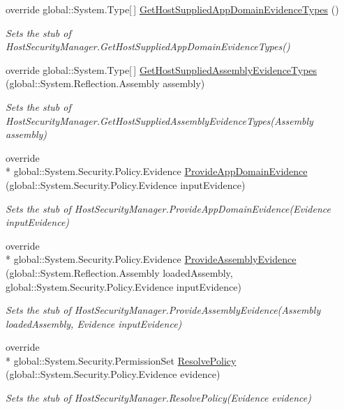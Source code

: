 \begin{DoxyCompactItemize}
override global\-::\-System.\-Type\mbox{[}$\,$\mbox{]} \hyperlink{class_system_1_1_security_1_1_fakes_1_1_stub_host_security_manager_a466f6fee524b1cc9ffa3f8e5c3e6c453}{Get\-Host\-Supplied\-App\-Domain\-Evidence\-Types} ()
\begin{DoxyCompactList}\small\item\em Sets the stub of Host\-Security\-Manager.\-Get\-Host\-Supplied\-App\-Domain\-Evidence\-Types()\end{DoxyCompactList}\item 
override global\-::\-System.\-Type\mbox{[}$\,$\mbox{]} \hyperlink{class_system_1_1_security_1_1_fakes_1_1_stub_host_security_manager_af9335da5c92f3f920ccef52457a0aa67}{Get\-Host\-Supplied\-Assembly\-Evidence\-Types} (global\-::\-System.\-Reflection.\-Assembly assembly)
\begin{DoxyCompactList}\small\item\em Sets the stub of Host\-Security\-Manager.\-Get\-Host\-Supplied\-Assembly\-Evidence\-Types(\-Assembly assembly)\end{DoxyCompactList}\item 
override \\*
global\-::\-System.\-Security.\-Policy.\-Evidence \hyperlink{class_system_1_1_security_1_1_fakes_1_1_stub_host_security_manager_a6a946ab1df3d8a860d0fa24f4ece7b59}{Provide\-App\-Domain\-Evidence} (global\-::\-System.\-Security.\-Policy.\-Evidence input\-Evidence)
\begin{DoxyCompactList}\small\item\em Sets the stub of Host\-Security\-Manager.\-Provide\-App\-Domain\-Evidence(\-Evidence input\-Evidence)\end{DoxyCompactList}\item 
override \\*
global\-::\-System.\-Security.\-Policy.\-Evidence \hyperlink{class_system_1_1_security_1_1_fakes_1_1_stub_host_security_manager_adaa7f201358faa5b1153ba2db52c5525}{Provide\-Assembly\-Evidence} (global\-::\-System.\-Reflection.\-Assembly loaded\-Assembly, global\-::\-System.\-Security.\-Policy.\-Evidence input\-Evidence)
\begin{DoxyCompactList}\small\item\em Sets the stub of Host\-Security\-Manager.\-Provide\-Assembly\-Evidence(\-Assembly loaded\-Assembly, Evidence input\-Evidence)\end{DoxyCompactList}\item 
override \\*
global\-::\-System.\-Security.\-Permission\-Set \hyperlink{class_system_1_1_security_1_1_fakes_1_1_stub_host_security_manager_aebd9b66b2f8f41c8d67a54e73f1b75bb}{Resolve\-Policy} (global\-::\-System.\-Security.\-Policy.\-Evidence evidence)
\begin{DoxyCompactList}\small\item\em Sets the stub of Host\-Security\-Manager.\-Resolve\-Policy(\-Evidence evidence)\end{DoxyCompactList}\end{DoxyCompactItemize}
